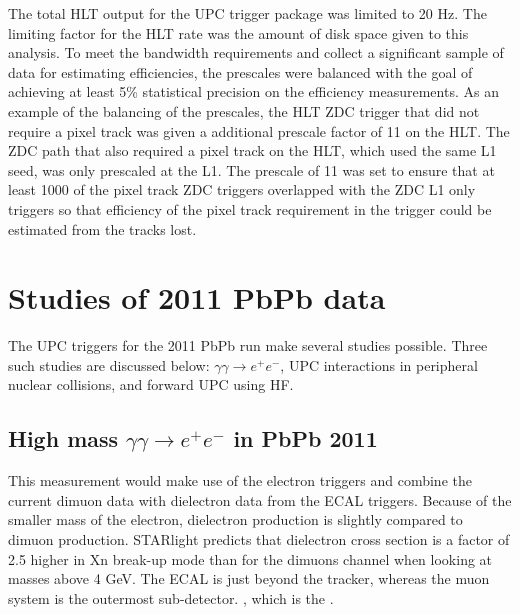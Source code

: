     The total HLT output for the UPC trigger package was limited to 20 Hz. 
    The limiting factor for the HLT rate was the amount of disk space given 
      to this analysis. 
    To meet the bandwidth requirements and collect a significant sample
      of data for estimating efficiencies, the prescales were balanced with 
      the goal of achieving at least 5\% statistical precision on the 
      efficiency measurements. 
    As an example of the balancing of the prescales, the HLT  ZDC trigger that 
      did not require a pixel track was given a additional prescale factor 
      of 11 on the HLT.
    The ZDC path that also required a pixel track on the HLT, which used 
      the same L1 seed, was only prescaled at the L1.
    The prescale of 11 was set to ensure that at least 1000 of the pixel track 
      ZDC triggers overlapped with the ZDC L1 only triggers so that efficiency
      of the pixel track requirement in the trigger could be estimated from 
      the tracks lost.

  \section{Studies of 2011 PbPb data}
    The UPC triggers for the 2011 PbPb run make several studies possible.
    Three such studies are discussed below: $\gamma\gamma \rightarrow e^{+} 
      e^{-}$, UPC interactions in peripheral nuclear collisions, and forward
      UPC \JPsi{} using HF. 

    \subsection{High mass $\gamma\gamma \rightarrow e^{+} e^{-}$  in PbPb 2011}
      This measurement would make use of the electron triggers and combine the 
        current dimuon data with dielectron data from the ECAL triggers.
      Because of the smaller mass of the electron,
        dielectron production is slightly \DIFdelbegin {}\DIFdelend \DIFaddbegin {}\DIFaddend compared to dimuon 
        production.
      STARlight predicts that dielectron cross section is a factor of 
        2.5 higher in Xn break-up mode than for the dimuons channel when looking 
        at masses above 4 GeV.
      The ECAL is \DIFdelbegin {}\DIFdelend \DIFaddbegin {}\DIFaddend just beyond the tracker, whereas the muon system is 
        the outermost sub-detector.
      \DIFdelbegin {}\DIFdelend \DIFaddbegin {}\DIFaddend , which
        is the \DIFdelbegin {}\DIFdelend \DIFaddbegin {}\DIFaddend .

